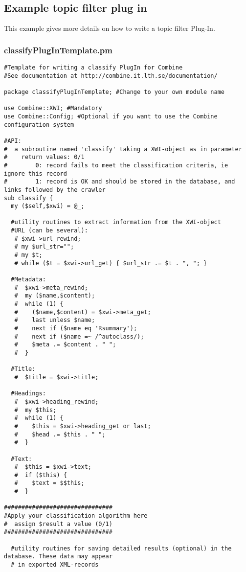 \subsection{Example topic filter plug in}
\label{classifyPlugInTemplate}

This example gives more
details on how to write a topic filter Plug-In. 

\subsubsection{classifyPlugInTemplate.pm}
\begin{verbatim}
#Template for writing a classify PlugIn for Combine
#See documentation at http://combine.it.lth.se/documentation/

package classifyPlugInTemplate; #Change to your own module name

use Combine::XWI; #Mandatory
use Combine::Config; #Optional if you want to use the Combine configuration system

#API:
#  a subroutine named 'classify' taking a XWI-object as in parameter
#    return values: 0/1
#        0: record fails to meet the classification criteria, ie ignore this record
#        1: record is OK and should be stored in the database, and links followed by the crawler
sub classify { 
  my ($self,$xwi) = @_;

  #utility routines to extract information from the XWI-object
  #URL (can be several):
   # $xwi->url_rewind;
   # my $url_str="";
   # my $t;
   # while ($t = $xwi->url_get) { $url_str .= $t . ", "; }

  #Metadata:
   #  $xwi->meta_rewind;
   #  my ($name,$content);
   #  while (1) {
   #    ($name,$content) = $xwi->meta_get;
   #    last unless $name;
   #    next if ($name eq 'Rsummary');
   #    next if ($name =~ /^autoclass/);
   #    $meta .= $content . " ";
   #  } 

  #Title:
   #  $title = $xwi->title;

  #Headings:
   #  $xwi->heading_rewind;
   #  my $this;
   #  while (1) {
   #    $this = $xwi->heading_get or last; 
   #    $head .= $this . " "; 
   #  }

  #Text:
   #  $this = $xwi->text;
   #  if ($this) {
   #    $text = $$this;
   #  }

###############################
#Apply your classification algorithm here
#  assign $result a value (0/1)
###############################

  #utility routines for saving detailed results (optional) in the database. These data may appear
  # in exported XML-records


\end{verbatim}
